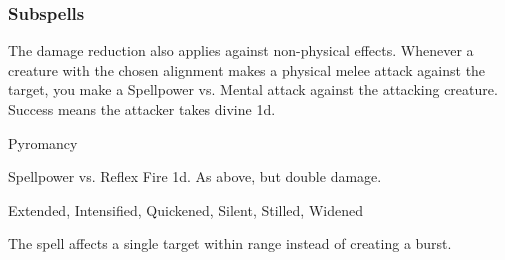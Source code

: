 \subsubsection{Subspells}
The damage reduction also applies against non-physical effects.
Whenever a creature with the chosen alignment makes a physical melee attack against the target, you make a Spellpower vs. Mental attack against the attacking creature.
Success means the attacker takes divine  \minus1d.
\begin{spellsection}{Pyromancy}
\begin{spellheader}
\end{spellheader}
\begin{spellcontent}
\begin{spelltargetinginfo}
\end{spelltargetinginfo}
\begin{spelleffects}
\begin{spellattack}{Spellpower vs. Reflex}
\spellsuccess Fire  \minus1d.
\spellcritical As above, but double damage.
\end{spellattack}
\end{spelleffects}
\end{spellcontent}
\begin{spellfooter}
 Extended, Intensified, Quickened, Silent, Stilled, Widened
\end{spellfooter}
\begin{spellsubcontent}
\begin{spellcantrip}
The spell affects a single target within range instead of creating a burst.
\end{spellcantrip}
\end{spellsubcontent}
\end{spellsection}
